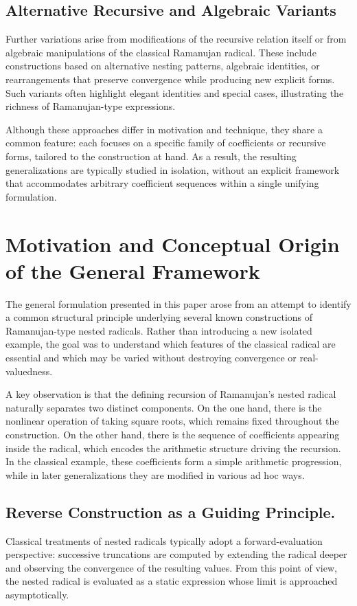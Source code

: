 \documentclass[11pt,a4paper]{amsart}
\theoremstyle{plain}
\theoremstyle{definition}
\theoremstyle{remark}
\begin{document}
\subsection{Alternative Recursive and Algebraic Variants}
\label{subsec:alternative-recursive}

Further variations arise from modifications of the recursive relation itself or from algebraic manipulations of the classical Ramanujan radical. These include constructions based on alternative nesting patterns, algebraic identities, or rearrangements that preserve convergence while producing new explicit forms. Such variants often highlight elegant identities and special cases, illustrating the richness of Ramanujan-type expressions.

Although these approaches differ in motivation and technique, they share a common feature: each focuses on a specific family of coefficients or recursive forms, tailored to the construction at hand. As a result, the resulting generalizations are typically studied in isolation, without an explicit framework that accommodates arbitrary coefficient sequences within a single unifying formulation.


\section{Motivation and Conceptual Origin of the General Framework}
\label{sec:motivation}

The general formulation presented in this paper arose from an attempt to identify a common structural principle underlying several known constructions of Ramanujan-type nested radicals. Rather than introducing a new isolated example, the goal was to understand which features of the classical radical are essential and which may be varied without destroying convergence or real-valuedness.

A key observation is that the defining recursion of Ramanujan’s nested radical naturally separates two distinct components. On the one hand, there is the nonlinear operation of taking square roots, which remains fixed throughout the construction. On the other hand, there is the sequence of coefficients appearing inside the radical, which encodes the arithmetic structure driving the recursion. In the classical example, these coefficients form a simple arithmetic progression, while in later generalizations they are modified in various ad hoc ways.

\subsection*{Reverse Construction as a Guiding Principle.}
Classical treatments of nested radicals typically adopt a forward-evaluation perspective: successive truncations are computed by extending the radical deeper and observing the convergence of the resulting values. From this point of view, the nested radical is evaluated as a static expression whose limit is approached asymptotically.
\end{document}

